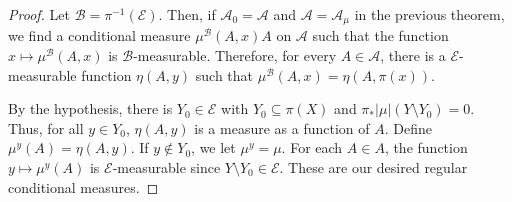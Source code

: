 \documentclass[10pt]{mypackage}
\begin{document}
\begin{proof}
  Let $\mathcal{B} = \pi^{-1}\left( \mathcal{E} \right)$. Then, if $\mathcal{A}_0 = \mathcal{A}$ and $\mathcal{A} = \mathcal{A}_{\mu}$ in the previous theorem, we find a conditional measure $\mu^{\mathcal{B}}\left( A,x \right)A$ on $\mathcal{A}$ such that the function $x\mapsto \mu^{\mathcal{B}}\left( A,x \right)$ is $\mathcal{B}$-measurable. Therefore, for every $A\in \mathcal{A}$, there is a $\mathcal{E}$-measurable function $\eta\left( A,y \right)$ such that $\mu^{\mathcal{B}}\left( A,x \right) = \eta\left( A,\pi(x) \right)$.

  By the hypothesis, there is $Y_0\in \mathcal{E}$ with $Y_0\subseteq \pi(X)$ and $\pi_{\ast}\left\vert \mu \right\vert\left( Y\setminus Y_0 \right) = 0$. Thus, for all $y\in Y_0$, $\eta\left( A,y \right)$ is a measure as a function of $A$. Define $\mu^y(A) = \eta\left( A,y \right)$. If $y\notin Y_0$, we let $\mu^y = \mu$. For each $A\in A$, the function $y\mapsto \mu^y(A)$ is $\mathcal{E}$-measurable since $Y\setminus Y_0\in \mathcal{E}$. These are our desired regular conditional measures.
\end{proof}
\nocite{measure_theory_bogachev,folland_real_analysis}
\end{document}
